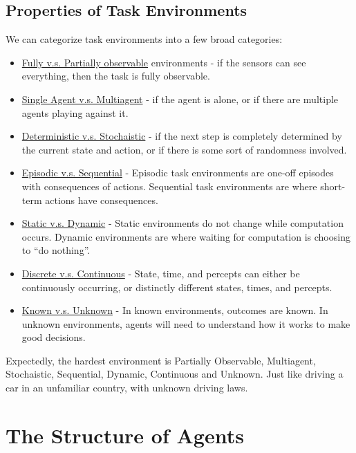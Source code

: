 \subsection{Properties of Task Environments} %
\label{sub:properties_of_task_environments}

We can categorize task environments into a few broad categories:
\begin{itemize}
    \item \uline{Fully v.s. Partially observable} environments - if the sensors
    can see everything, then the task is fully observable.
    \item \uline{Single Agent v.s. Multiagent} - if the agent is alone, or if
    there are multiple agents playing against it.
    \item \uline{Deterministic v.s. Stochaistic} - if the next step is
    completely determined by the current state and action, or if there is some
    sort of randomness involved.
    \item \uline{Episodic v.s. Sequential} -
    Episodic task environments are one-off episodes with consequences of actions.
    Sequential task environments are where short-term actions have consequences.
    \item \uline{Static v.s. Dynamic} -
    Static environments do not change while computation occurs.
    Dynamic environments  are where waiting for computation is choosing to
    ``do nothing''.
    \item \uline{Discrete v.s. Continuous} -
    State, time, and percepts can either be continuously occurring, or
    distinctly different states, times, and percepts.
    \item \uline{Known v.s. Unknown} -
    In known environments, outcomes are known.
    In unknown environments, agents will need to understand how it works to make
    good decisions.
\end{itemize}

Expectedly, the hardest environment is Partially Observable, Multiagent,
Stochaistic, Sequential, Dynamic, Continuous and Unknown.
Just like driving a car in an unfamiliar country, with unknown driving laws.



\section{The Structure of Agents} %
\label{sec:the_structure_of_agents}


